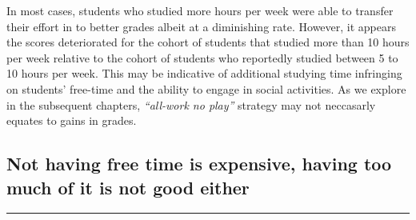\documentclass[
]{article}
\begin{document}
In most cases, students who studied more hours per week were able to
transfer their effort in to better grades albeit at a diminishing rate.
However, it appears the scores deteriorated for the cohort of students
that studied more than 10 hours per week relative to the cohort of
students who reportedly studied between 5 to 10 hours per week. This may
be indicative of additional studying time infringing on students'
free-time and the ability to engage in social activities. As we explore
in the subsequent chapters, \emph{``all-work no play''} strategy may not
neccasarly equates to gains in grades.

\hypertarget{not-having-free-time-is-expensive-having-too-much-of-it-is-not-good-either}{%
\subsection{Not having free time is expensive, having too much of it is
not good
either}\label{not-having-free-time-is-expensive-having-too-much-of-it-is-not-good-either}}

\begin{center}\rule{0.5\linewidth}{0.5pt}\end{center}
\end{document}

